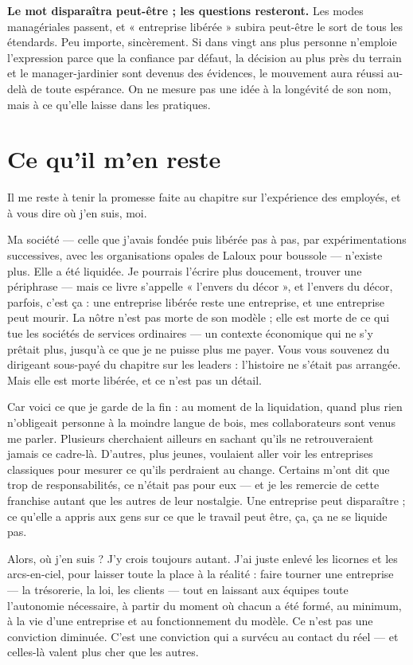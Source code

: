 \textbf{Le mot disparaîtra peut-être ; les questions resteront.} Les modes managériales passent, et « entreprise libérée » subira peut-être le sort de tous les étendards. Peu importe, sincèrement. Si dans vingt ans plus personne n'emploie l'expression parce que la confiance par défaut, la décision au plus près du terrain et le manager-jardinier sont devenus des évidences, le mouvement aura réussi au-delà de toute espérance. On ne mesure pas une idée à la longévité de son nom, mais à ce qu'elle laisse dans les pratiques.

\section*{Ce qu'il m'en reste}

Il me reste à tenir la promesse faite au chapitre sur l'expérience des employés, et à vous dire où j'en suis, moi.

Ma société — celle que j'avais fondée puis libérée pas à pas, par expérimentations successives, avec les organisations opales de Laloux pour boussole — n'existe plus. Elle a été liquidée. Je pourrais l'écrire plus doucement, trouver une périphrase — mais ce livre s'appelle « l'envers du décor », et l'envers du décor, parfois, c'est ça : une entreprise libérée reste une entreprise, et une entreprise peut mourir. La nôtre n'est pas morte de son modèle ; elle est morte de ce qui tue les sociétés de services ordinaires — un contexte économique qui ne s'y prêtait plus, jusqu'à ce que je ne puisse plus me payer. Vous vous souvenez du dirigeant sous-payé du chapitre sur les leaders : l'histoire ne s'était pas arrangée. Mais elle est morte libérée, et ce n'est pas un détail.

Car voici ce que je garde de la fin : au moment de la liquidation, quand plus rien n'obligeait personne à la moindre langue de bois, mes collaborateurs sont venus me parler. Plusieurs cherchaient ailleurs en sachant qu'ils ne retrouveraient jamais ce cadre-là. D'autres, plus jeunes, voulaient aller voir les entreprises classiques pour mesurer ce qu'ils perdraient au change. Certains m'ont dit que trop de responsabilités, ce n'était pas pour eux — et je les remercie de cette franchise autant que les autres de leur nostalgie. Une entreprise peut disparaître ; ce qu'elle a appris aux gens sur ce que le travail peut être, ça, ça ne se liquide pas.

Alors, où j'en suis ? J'y crois toujours autant. J'ai juste enlevé les licornes et les arcs-en-ciel, pour laisser toute la place à la réalité : faire tourner une entreprise — la trésorerie, la loi, les clients — tout en laissant aux équipes toute l'autonomie nécessaire, à partir du moment où chacun a été formé, au minimum, à la vie d'une entreprise et au fonctionnement du modèle. Ce n'est pas une conviction diminuée. C'est une conviction qui a survécu au contact du réel — et celles-là valent plus cher que les autres.

